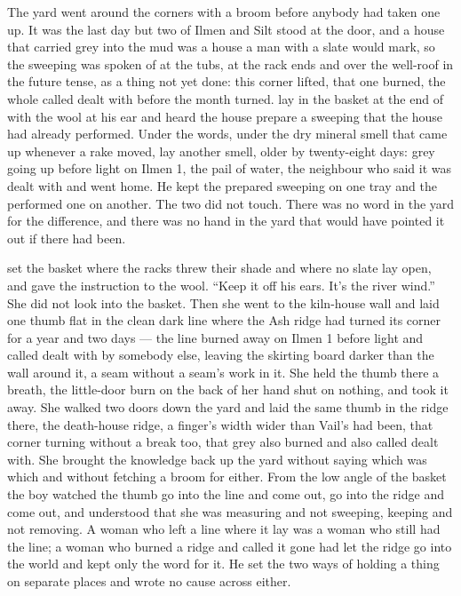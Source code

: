 
The yard went around the corners with a broom before anybody had taken one up. It was the last day but two of Ilmen and Silt stood at the door, and a house that carried grey into the mud was a house a man with a slate would mark, so the sweeping was spoken of at the tubs, at the rack ends and over the well-roof in the future tense, as a thing not yet done: this corner lifted, that one burned, the whole called dealt with before the month turned.  lay in the basket at the end of  with the wool at his ear and heard the house prepare a sweeping that the house had already performed. Under the words, under the dry mineral smell that came up whenever a rake moved, lay another smell, older by twenty-eight days: grey going up before light on Ilmen 1, the pail of water, the neighbour who said it was dealt with and went home. He kept the prepared sweeping on one tray and the performed one on another. The two did not touch. There was no word in the yard for the difference, and there was no hand in the yard that would have pointed it out if there had been.

 set the basket where the racks threw their shade and where no slate lay open, and gave the instruction to the wool. “Keep it off his ears. It's the river wind.” She did not look into the basket. Then she went to the kiln-house wall and laid one thumb flat in the clean dark line where the Ash ridge had turned its corner for a year and two days --- the line burned away on Ilmen 1 before light and called dealt with by somebody else, leaving the skirting board darker than the wall around it, a seam without a seam's work in it. She held the thumb there a breath, the little-door burn on the back of her hand shut on nothing, and took it away. She walked two doors down the yard and laid the same thumb in the ridge there, the death-house ridge, a finger's width wider than Vail's had been, that corner turning without a break too, that grey also burned and also called dealt with. She brought the knowledge back up the yard without saying which was which and without fetching a broom for either. From the low angle of the basket the boy watched the thumb go into the line and come out, go into the ridge and come out, and understood that she was measuring and not sweeping, keeping and not removing. A woman who left a line where it lay was a woman who still had the line; a woman who burned a ridge and called it gone had let the ridge go into the world and kept only the word for it. He set the two ways of holding a thing on separate places and wrote no cause across either.

